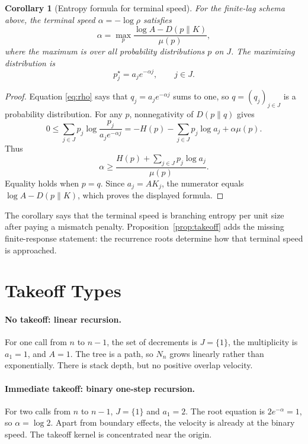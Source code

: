 \documentclass[10pt,twocolumn]{article}
\newtheorem{corollary}{Corollary}
\begin{document}
\begin{corollary}[Entropy formula for terminal speed]\label{cor:entropy}
For the finite-lag schema above, the terminal speed \(\alpha=-\log\rho\) satisfies
\[
        \alpha
        =
        \max_{p}
        \frac{\log A-D(p\|K)}{\mu(p)},
\]
where the maximum is over all probability distributions \(p\) on \(J\).  The maximizing distribution is
\[
        p_j^\star=a_je^{-\alpha j},
        \qquad j\in J.
\]
\end{corollary}

\begin{proof}
Equation \eqref{eq:rho} says that \(q_j=a_je^{-\alpha j}\) sums to one, so \(q=(q_j)_{j\in J}\) is a probability distribution.  For any \(p\), nonnegativity of \(D(p\|q)\) gives
\[
        0
        \le
        \sum_{j\in J}p_j\log\frac{p_j}{a_je^{-\alpha j}}
        =
        -H(p)-\sum_{j\in J}p_j\log a_j+\alpha\mu(p).
\]
Thus
\[
        \alpha
        \ge
        \frac{H(p)+\sum_{j\in J}p_j\log a_j}{\mu(p)}.
\]
Equality holds when \(p=q\).  Since \(a_j=AK_j\), the numerator equals \(\log A-D(p\|K)\), which proves the displayed formula.
\end{proof}

The corollary says that the terminal speed is branching entropy per unit size after paying a mismatch penalty.  Proposition~\ref{prop:takeoff} adds the missing finite-response statement: the recurrence roots determine how that terminal speed is approached.

\section{Takeoff Types}

\paragraph{No takeoff: linear recursion.}
For one call from \(n\) to \(n-1\), the set of decrements is \(J=\{1\}\), the multiplicity is \(a_1=1\), and \(A=1\).  The tree is a path, so \(N_n\) grows linearly rather than exponentially.  There is stack depth, but no positive overlap velocity.

\paragraph{Immediate takeoff: binary one-step recursion.}
For two calls from \(n\) to \(n-1\), \(J=\{1\}\) and \(a_1=2\).  The root equation is \(2e^{-\alpha}=1\), so \(\alpha=\log2\).  Apart from boundary effects, the velocity is already at the binary speed.  The takeoff kernel is concentrated near the origin.
\end{document}
